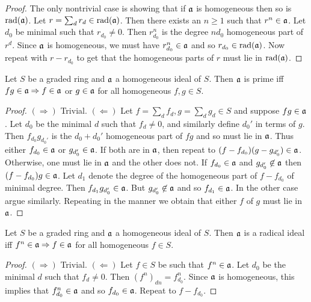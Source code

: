 \documentclass{memoir}
\begin{document}
\begin{proof}
    The only nontrivial case is showing that if $\mathfrak{a}$ is homogeneous then so is $\text{rad}(\mathfrak{a})$.
    Let $r = \sum_{d} r_d \in \text{rad}(\mathfrak{a})$.
    Then there exists an $n\ge1$ such that $r^n\in \mathfrak{a}$.
    Let $d_0$ be minimal such that $r_{d_0}\ne 0$.
    Then $r_{d_0}^n$ is the degree $nd_0$ homogeneous part of $r^d$.
    Since $\mathfrak{a}$ is homogeneous, we must have $r_{d_0}^n\in \mathfrak{a}$ and so $r_{d_0}\in \text{rad}(\mathfrak{a})$.
    Now repeat with $r-r_{d_0}$ to get that the homogeneous parts of $r$ must lie in $\text{rad}(\mathfrak{a})$.
\end{proof}
\begin{proposition}
    Let $S$ be a graded ring and $\mathfrak{a}$ a homogeneous ideal of $S$.
    Then $\mathfrak{a}$ is prime iff $fg\in \mathfrak{a} \Rightarrow f\in\mathfrak{a}$ or $g\in\mathfrak{a}$ for all homogeneous $f,g\in S$.
\end{proposition}
\begin{proof}
    $(\Rightarrow)$ Trivial. 
    $(\Leftarrow)$ Let $f = \sum_{d}f_d,g = \sum_{d}g_d\in S$ and suppose $fg\in \mathfrak{a}$.
    Let $d_0$ be the minimal $d$ such that $f_d\ne 0$, and similarly define $d_0'$ in terms of $g$.
    Then $f_{d_0}g_{d_0'}$ is the $d_0+d_0'$ homogeneous part of $fg$ and so must lie in $\mathfrak{a}$.
    Thus either $f_{d_0}\in \mathfrak{a}$ or $g_{d_0'}\in \mathfrak{a}$.
    If both are in $\mathfrak{a}$, then repeat to $(f-f_{d_0})(g-g_{d_0'})\in \mathfrak{a}$.
    Otherwise, one must lie in $\mathfrak{a}$ and the other does not.
    If $f_{d_0}\in \mathfrak{a}$ and $g_{d_0'}\not\in \mathfrak{a}$ then $(f-f_{d_0})g\in \mathfrak{a}$.
    Let $d_1$ denote the degree of the homogeneous part of $f-f_{d_0}$ of minimal degree.
    Then $f_{d_1}g_{d_0'}\in\mathfrak{a}$.
    But $g_{d_0'}\not\in\mathfrak{a}$ and so $f_{d_1}\in\mathfrak{a}$.
    In the other case argue similarly.
    Repeating in the manner we obtain that either $f$ of $g$ must lie in $\mathfrak{a}$.
\end{proof}
\begin{proposition}
    Let $S$ be a graded ring and $\mathfrak{a}$ a homogeneous ideal of $S$.
    Then $\mathfrak{a}$ is a radical ideal iff $f^n\in \mathfrak{a} \Rightarrow f\in \mathfrak{a}$ for all homogeneous $f\in S$.
\end{proposition}
\begin{proof}
    $(\Rightarrow)$ Trivial. 
    $(\Leftarrow)$ Let $f\in S$ be such that $f^n\in \mathfrak{a}$.
    Let $d_0$ be the minimal $d$ such that $f_d\ne 0$.
    Then $(f^n)_{dn} = f_{d_0}^n$.
    Since $\mathfrak{a}$ is homogeneous, this implies that $f_{d_0}^n\in \mathfrak{a}$ and so $f_{d_0}\in \mathfrak{a}$.
    Repeat to $f-f_{d_0}$.
\end{proof}
\end{document}
